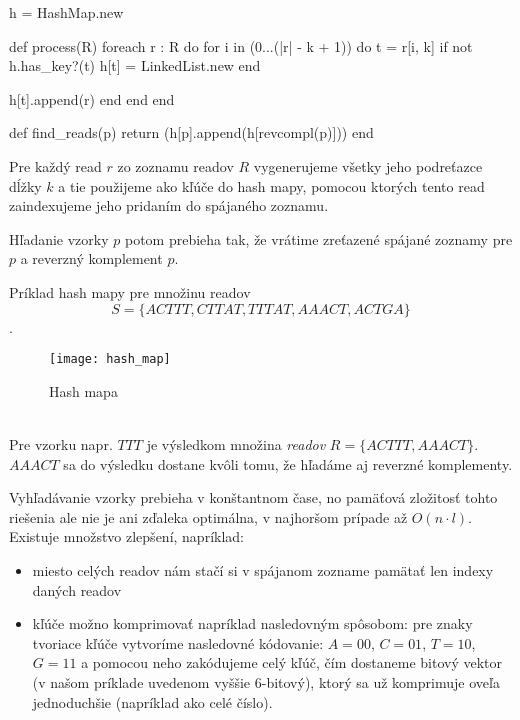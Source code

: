 \bigskip
\begin{pseudocode}[label=lst:hash_algorithm,caption={Algoritmus na riešenie
problému indexovania readov pomocou hash mapy}]
h = HashMap.new

def process(R)
  foreach r : R do
    for i in (0...(|r| - k + 1)) do
      t = r[i, k]
      if not h.has_key?(t)
        h[t] = LinkedList.new
      end
        
      h[t].append(r)
    end 
  end
end

def find_reads(p)
  return (h[p].append(h[revcompl(p)]))
end
\end{pseudocode}
\bigskip

Pre každý read $r$ zo zoznamu readov $R$ vygenerujeme všetky jeho
podreťazce dĺžky $k$ a tie použijeme ako kľúče do hash mapy, pomocou ktorých
tento read zaindexujeme jeho pridaním do spájaného zoznamu.

Hľadanie vzorky $p$ potom prebieha tak, že vrátime zreťazené spájané
zoznamy pre $p$ a reverzný komplement $p$.

\begin{example}
    Príklad hash mapy pre množinu readov $$S = \{ACTTT, CTTAT, TTTAT,
    AAACT, ACTGA\}$$.
    \begin{figure}[h]
        \centering
        \texttt{[image: hash\_map]}
        \caption{Hash mapa}
        \label{fig:hash_map}
    \end{figure}
    \\
    Pre vzorku napr. $TTT$ je výsledkom množina \emph{readov} $R =
    \{ACTTT, AAACT\}$. $AAACT$ sa do výsledku dostane kvôli tomu, že hľadáme aj reverzné komplementy.
\end{example}

Vyhľadávanie vzorky prebieha v konštantnom čase, no pamäťová zložitosť tohto
riešenia ale nie je ani zďaleka optimálna, v najhoršom prípade až $O(n \cdot
l)$. Existuje množstvo zlepšení, napríklad:

\begin{itemize}
    \item miesto celých readov nám stačí si v spájanom zozname
    pamätať len indexy daných readov
    \item kľúče možno komprimovať napríklad nasledovným spôsobom: pre znaky
    tvoriace kľúče vytvoríme nasledovné kódovanie: $A = 00$, $C = 01$, $T = 10$,
    $G = 11$ a pomocou neho zakódujeme celý kľúč, čím dostaneme bitový vektor
    (v našom príklade uvedenom vyššie 6-bitový), ktorý sa už komprimuje oveľa
    jednoduchšie (napríklad ako celé číslo).
\end{itemize}


